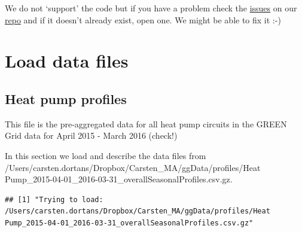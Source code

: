 \documentclass[]{article}
\newenvironment{Shaded}{\begin{snugshade}}{\end{snugshade}}
\newcommand{\KeywordTok}[1]{\textcolor[rgb]{0.13,0.29,0.53}{\textbf{#1}}}
\newcommand{\StringTok}[1]{\textcolor[rgb]{0.31,0.60,0.02}{#1}}
\newcommand{\OperatorTok}[1]{\textcolor[rgb]{0.81,0.36,0.00}{\textbf{#1}}}
\newcommand{\NormalTok}[1]{#1}
\theoremstyle{definition}
\theoremstyle{definition}
\theoremstyle{definition}
\theoremstyle{remark}
\begin{document}
We do not `support' the code but if you have a problem check the
\href{https://git.soton.ac.uk/ba1e12/nzGREENGrid/issues}{issues} on our
\href{https://git.soton.ac.uk/ba1e12/nzGREENGrid}{repo} and if it
doesn't already exist, open one. We might be able to fix it :-)

\section{Load data files}\label{load-data-files}

\subsection{Heat pump profiles}\label{heat-pump-profiles}

This file is the pre-aggregated data for all heat pump circuits in the
GREEN Grid data for April 2015 - March 2016 (check!)

\begin{Shaded}
\end{Shaded}

In this section we load and describe the data files from
/Users/carsten.dortans/Dropbox/Carsten\_MA/ggData/profiles/Heat
Pump\_2015-04-01\_2016-03-31\_overallSeasonalProfiles.csv.gz.

\begin{Shaded}
\end{Shaded}

\begin{verbatim}
## [1] "Trying to load: /Users/carsten.dortans/Dropbox/Carsten_MA/ggData/profiles/Heat Pump_2015-04-01_2016-03-31_overallSeasonalProfiles.csv.gz"
\end{verbatim}

\begin{Shaded}
\end{Shaded}
\end{document}
